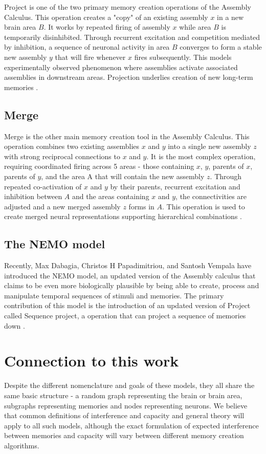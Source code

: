 Project is one of the two primary memory creation operations of the Assembly Calculus. This operation creates a "copy" of an existing assembly $x$ in a new brain area $B$. It works by repeated firing of assembly $x$ while area $B$ is temporarily disinhibited. Through recurrent excitation and competition mediated by inhibition, a sequence of neuronal activity in area $B$ converges to form a stable new assembly $y$ that will fire whenever $x$ fires subsequently. This models experimentally observed phenomenon where assemblies activate associated assemblies in downstream areas. Projection underlies creation of new long-term memories \cite{papadimitriou2020brain}.

\subsection{Merge}

Merge is the other main memory creation tool in the Assembly Calculus. This operation combines two existing assemblies $x$ and $y$ into a single new assembly $z$ with strong reciprocal connections to $x$ and $y$. It is the most complex operation, requiring coordinated firing across 5 areas - those containing $x$, $y$, parents of $x$, parents of $y$, and the area A that will contain the new assembly $z$. Through repeated co-activation of $x$ and $y$ by their parents, recurrent excitation and inhibition between $A$ and the areas containing $x$ and $y$, the connectivities are adjusted and a new merged assembly $z$ forms in $A$. This operation is used to create merged neural representations supporting hierarchical combinations \cite{papadimitriou2020brain}.

\subsection{The NEMO model}

Recently, Max Dabagia, Christos H Papadimitriou, and Santosh Vempala have introduced the NEMO model, an updated version of the Assembly calculus that claims to be even more biologically plausible by being able to create, process and manipulate temporal sequences of stimuli and memories. The primary contribution of this model is the introduction of an updated version of Project called Sequence project, a operation that can project a sequence of memories down \cite{dabagia2023computation}.  

\section{Connection to this work}

Despite the different nomenclature and goals of these models, they all share the same basic structure - a random graph representing the brain or brain area, subgraphs representing memories and nodes representing neurons. We believe that common definitions of interference and capacity and general theory will apply to all such models, although the exact formulation of expected interference between memories and capacity will vary between different memory creation algorithms. 
